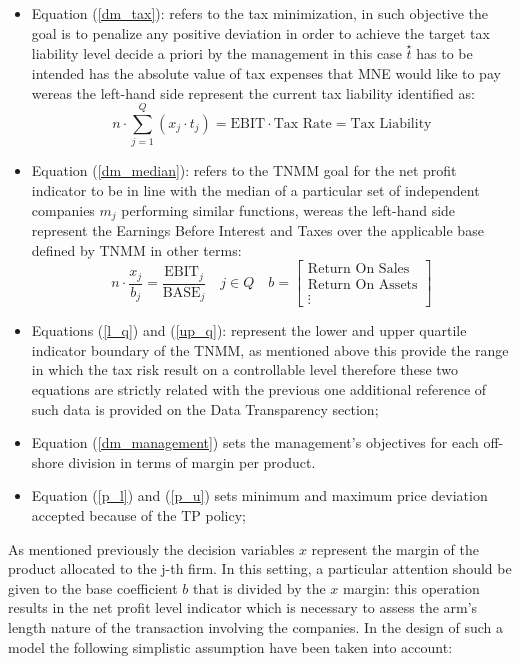 \documentclass[conference,final,]{IEEEtran}
\begin{document}
\begin{itemize}
\item Equation (\ref{dm_tax}): refers to the tax minimization, in such objective the goal is to penalize any positive deviation in order to achieve the target tax liability level decide a priori by the management in this case $\overset{\star}{t}$ has to be intended has the absolute value of tax expenses that MNE would like to pay wereas the left-hand side represent the current tax liability identified as:
  $$
  n\cdot \sum^{Q}_{j=1}(x_j\cdot t_j)  = \text{EBIT} \cdot \text{Tax Rate} = \text {Tax Liability} 
  $$
\item Equation (\ref{dm_median}): refers to the TNMM goal for the net profit indicator to be in line with the median of a particular set of independent companies $m_j$ performing similar functions, wereas the left-hand side represent the Earnings Before Interest and Taxes over the applicable base defined by TNMM in other terms:
  $$
  n\cdot \frac{x_j}{b_j} = \frac{\text{EBIT}_j}{\text{BASE}_j} \quad j \in Q \quad b = \begin{bmatrix} \text{Return On Sales} \\ \text{Return On Assets} \\ \vdots \end{bmatrix}
  $$
\item Equations (\ref{l_q}) and (\ref{up_q}): represent the lower and upper quartile indicator boundary of the TNMM, as mentioned above this provide the range in which the tax risk result on a controllable level therefore these two equations are strictly related with the previous one additional reference of such data is provided on the Data Transparency section;
\item Equation (\ref{dm_management}) sets the management's objectives for each off-shore division in terms of margin per product.
\item Equation (\ref{p_l}) and (\ref{p_u}) sets minimum and maximum price deviation accepted because of the TP policy; 
\end{itemize}
As mentioned previously the decision variables \(x\) represent the margin of the product allocated to the j-th firm. In this setting, a particular attention should be given to the base coefficient \(b\) that is divided by the \(x\) margin: this operation results in the net profit level indicator which is necessary to assess the arm's length nature of the transaction involving the companies. In the design of such a model the following simplistic assumption have been taken into account:
\end{document}

